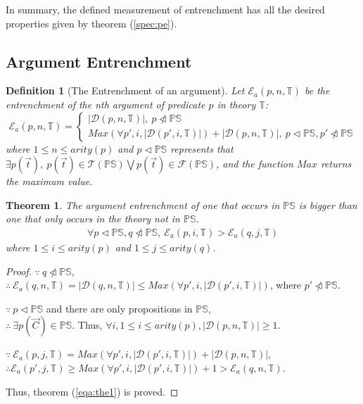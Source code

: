\documentclass[11pt,letterpaper]{article}
\newtheorem{defn}{Definition}[section]
\newtheorem{theorem}{Theorem}[section]
\newcommand{\pf}[1]{\mathcal{#1}(\mathbb{PS})}
\newcommand{\ps}{\mathbb{PS}}
\newcommand{\theory}{\mathbb{T}}
\begin{document}
In summary, the defined measurement of entrenchment has all the desired properties given by theorem (\ref{spec:pe}).


\subsection{Argument Entrenchment}
\label{sec:ee:args}


\begin{defn}[The Entrenchment of an argument]
Let $ \mathcal{E}_{a}(p, n, \theory)$ be the entrenchment of the nth argument of predicate $p$ in theory $\theory$:
\begin{equation}\label{equ:ref:aren}
    \mathcal{E}_{a}(p, n, \theory) =
    \begin{cases}
    |\mathcal{D}(p, n, \theory)|,\  p \ntriangleleft \mathbb{PS}\\
    Max(\forall p',i, |\mathcal{D}(p', i, \theory)|)+|\mathcal{D}(p, n, \theory)|,\ p \triangleleft \mathbb{PS}, p' \ntriangleleft \mathbb{PS}
    \end{cases}
\end{equation}
where $1\leq n\leq arity(p)$ and $p \triangleleft \mathbb{PS}$ represents that $\exists p(\vec{t}),\ p(\vec{t}) \in \pf{T} \bigvee p(\vec{t}) \in \pf{F}$, and the function $Max$ returns the maximum value.
\end{defn}


\begin{theorem}
The argument entrenchment of one that occurs in $\ps$ is bigger than one that only occurs in the theory not in $\ps$.
 \begin{align}\label{eqa:the1}
     \forall p \triangleleft \mathbb{PS}, q \ntriangleleft \mathbb{PS},\  \mathcal{E}_{a}(p, i, \theory) > \mathcal{E}_{a}(q, j, \theory)
 \end{align}
 where $1\leq i\leq arity(p)$ and $1\leq j\leq arity(q)$.
\end{theorem}

\begin{proof} $\because\ q \ntriangleleft \mathbb{PS}$,\\ 
$\therefore\ \mathcal{E}_{a}(q, n, \theory) = |\mathcal{D}(q, n, \theory)| \leq Max(\forall p',i, |\mathcal{D}(p', i, \theory)|)$, where $p'\ntriangleleft \mathbb{PS}$.


$\because\  p \triangleleft \ps$ and there are only propositions in $\ps$,\\
$\therefore\ \exists p(\vec{C}) \in \ps$. Thus, $\forall i, 1\leq i\leq arity(p), |\mathcal{D}(p, n, \theory)| \geq 1$. 

$\because\ \mathcal{E}_{a}(p, j, \theory) = Max(\forall p',i, |\mathcal{D}(p', i, \theory)|)+|\mathcal{D}(p, n, \theory)|$,\\
$\therefore \mathcal{E}_{a}(p', j, \theory) \geq Max(\forall p',i, |\mathcal{D}(p', i, \theory)|)+1 > \mathcal{E}_{a}(q, n, \theory)$.

Thus, theorem (\ref{eqa:the1}) is proved.

\end{proof}
\end{document}
